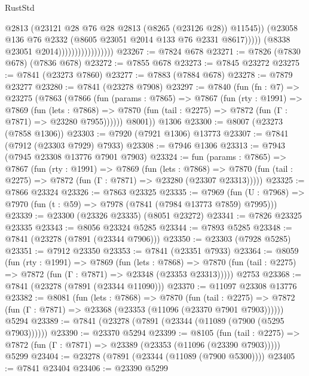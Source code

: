 \begin{lexlean}{RustStd}
\begin{coremodule}
{\begin{coremodule}
{{{{{{{{{{{{{{{{{{{{{{{{{{{{{{{{{{{{{{{{{{{{{{{{{{{{{{                                            @2813
                                            (@23121 @28 @76 @28 @2813 (@8265 (@23126 @28)) @11545))
                                          (@23058
                                            @136
                                            @76
                                            @2332
                                            (@8605 @23051 @2014 @133 @76 @2331 @8617)))))
                                    (@8338 @23051 @2014)))))))))))))))))
@23267 := @7824 @678
@23271 := @7826 (@7830 @678) (@7836 @678)
@23272 := @7855 @678
@23273 := @7845 @23272
@23275 := @7841 (@23273 @7860)
@23277 := @7883 (@7884 @678)
@23278 := @7879 @23277
@23280 := @7841 (@23278 @7908)
@23297 := @7840
    (fun (fn : @7) =>
    @23275
      (@7863
        (@7866
          (fun (params : @7865) =>
          @7867
            (fun (rty : @1991) =>
            @7869
              (fun (lets : @7868) =>
              @7870 (fun (tail : @2275) => @7872 (fun (Γ : @7871) => @23280 @7955))))))
        @8001))
    @1306
@23300 := @8007 (@23273 (@7858 @1306))
@23303 := @7920 (@7921 @1306) @13773
@23307 := @7841 (@7912 (@23303 @7929) @7933)
@23308 := @7946 @1306
@23313 := @7943 (@7945 @23308 @13776 @7901 @7903)
@23324 := fun (params : @7865) =>
  @7867
    (fun (rty : @1991) =>
    @7869
      (fun (lets : @7868) =>
      @7870 (fun (tail : @2275) => @7872 (fun (Γ : @7871) => @23280 (@23307 @23313)))))
@23325 := @7866 @23324
@23326 := @7863 @23325
@23335 := @7969
    (fun (U : @7968) => @7970 (fun (t : @59) => @7978 (@7841 (@7984 @13773 @7859) @7995)))
@23339 := @23300 (@23326 @23335) (@8051 @23272)
@23341 := @7826 @23325 @23335
@23343 := @8056 @23324 @5285
@23344 := @7893 @5285
@23348 := @7841 (@23278 (@7891 (@23344 @7906)))
@23350 := @23303 (@7928 @5285)
@23351 := @7912 @23350
@23353 := @7841 (@23351 @7933)
@23364 := @8059
    (fun (rty : @1991) =>
    @7869
      (fun (lets : @7868) =>
      @7870 (fun (tail : @2275) => @7872 (fun (Γ : @7871) => @23348 (@23353 @23313)))))
    @2753
@23368 := @7841 (@23278 (@7891 (@23344 @11090)))
@23370 := @11097 @23308 @13776
@23382 := @8081
    (fun (lets : @7868) =>
    @7870
      (fun (tail : @2275) =>
      @7872 (fun (Γ : @7871) => @23368 (@23353 (@11096 (@23370 @7901 @7903))))))
    @5294
@23389 := @7841 (@23278 (@7891 (@23344 (@11089 (@7900 (@5295 @7903))))))
@23390 := @23370 @5294
@23399 := @8105
    (fun (tail : @2275) => @7872 (fun (Γ : @7871) => @23389 (@23353 (@11096 (@23390 @7903)))))
    @5299
@23404 := @23278 (@7891 (@23344 (@11089 (@7900 @5300))))
@23405 := @7841 @23404
@23406 := @23390 @5299
}}}}}}}}}}}}}}}}}}}}}}}}}}}}}}}}}}}}}}}}}}}}}}}}}}}}}}
\end{coremodule}}
\end{coremodule}
\end{lexlean}
